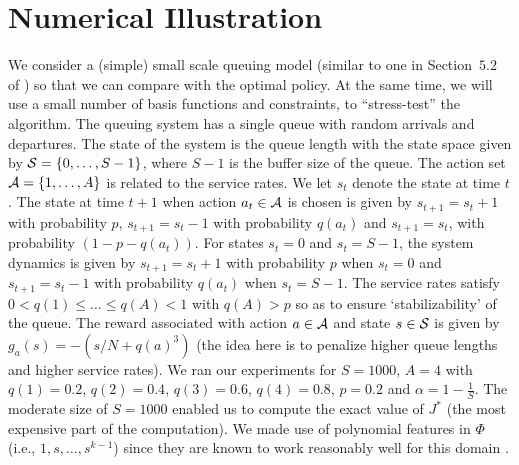 \documentclass[twocolumn]{IEEEtran}
\begin{document}
\section{Numerical Illustration}
\begin{comment}
Here we compare two different constraint selection strategies namely LRA and CS, where  LRA is the one based on the \emph{conic} cover principle discussed in \Cref{mainresults} preceding \Cref{conetheorm}, and CS is based on constraint sampling an approach studied in prior literature \cite{CS}. We run the experiments in a queuing model similar to one in Section~$5.2$ of \cite{ALP}. %
\end{comment}
We consider a (simple) small scale queuing model (similar to one in Section~$5.2$ of \cite{ALP}) so that we can compare with the optimal policy.
At the same time, we will use a small number of basis functions and constraints, to ``stress-test'' the algorithm.
The queuing system has a single queue with random arrivals and departures. 
The state of the system is the queue length with the state space given by $\S=\{0,\ldots,S-1\}$, 
where $S-1$ is the buffer size of the queue. 
The action set $\A=\{1,\ldots,A\}$ is related to the service rates. 
We let $s_t$ denote the state at time $t$. 
The state at time $t+1$ when action $a_t \in \A$ is chosen is given by $s_{t+1}= s_{t}+1$ with probability $p$, 
$s_{t+1}= s_{t}-1$ with probability $q(a_t)$ and $s_{t+1}= s_t$, with probability $(1-p-q(a_t))$. 
For states $s_t=0$ and $s_t=S-1$, the system dynamics is given by $s_{t+1}= s_{t}+1$ 
with probability $p$ when $s_t=0$ and $s_{t+1}=s_t-1$ with probability $q(a_t)$ when $s_t=S-1$. 
The service rates satisfy $0<q(1)\leq \ldots\leq q(A)<1$ with $q(A)>p$ so as to ensure `stabilizability' of the queue.
The reward associated with  action $a \in \A$ and state $s\in \S$ is given by $g_a(s)=-(s/N+q(a)^3)$
(the idea here is to penalize higher queue lengths and higher service rates). 
We ran our experiments for $S=1000$, $A=4$ with $q(1)=0.2$, $q(2)=0.4$, $q(3)=0.6$, $q(4)=0.8$, $p=0.2$ and $\alpha=1-\frac{1}{S}$. The moderate size of $S=1000$ enabled us to compute the exact value of $J^*$ (the most expensive part of the computation).
We made use of polynomial features in $\Phi$ (i.e., $1,s,\ldots,s^{k-1}$)
since they are known to work reasonably well for this domain \cite{ALP}.
\end{document}

